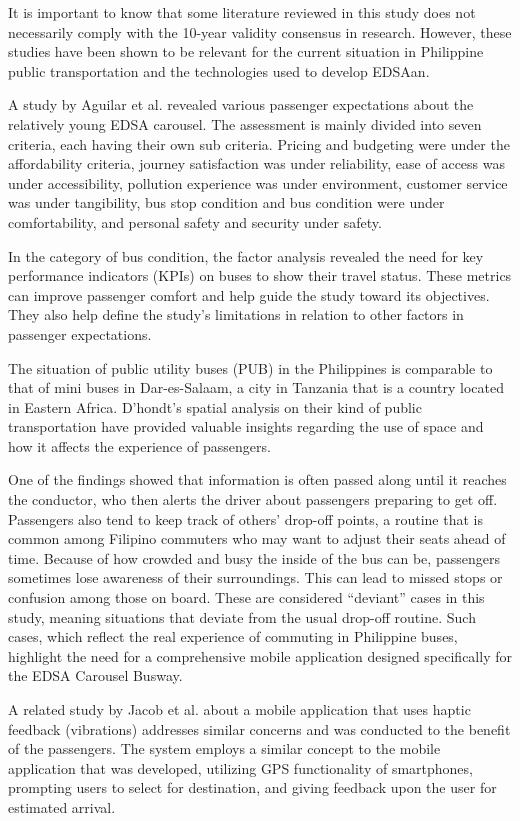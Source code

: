 \documentclass[journal]{./IEEE/IEEEtran}
\begin{document}
It is important to know that some literature reviewed in this study does not necessarily comply with the 10-year validity consensus in research. However, these studies have been shown to be relevant for the current situation in Philippine public transportation and the technologies used to develop EDSAan.

A study by Aguilar et al. \cite{Ref:001} revealed various passenger expectations about the relatively young EDSA carousel. The assessment is mainly divided into seven criteria, each having their own sub criteria. Pricing and budgeting were under the affordability criteria, journey satisfaction was under reliability,  ease of access was under accessibility, pollution experience was under environment, customer service was under tangibility, bus stop condition and bus condition were under comfortability, and personal safety and security under safety.

In the category of bus condition, the factor analysis revealed the need for key performance indicators (KPIs) on buses to show their travel status. These metrics can improve passenger comfort and help guide the study toward its objectives. They also help define the study’s limitations in relation to other factors in passenger expectations.

The situation of public utility buses (PUB) in the Philippines is comparable to that of mini buses in Dar-es-Salaam, a city in Tanzania that is a country located in Eastern Africa. D’hondt’s \cite{Ref:005} spatial analysis on their kind of public transportation have provided valuable insights regarding the use of space and how it affects the experience of passengers.

One of the findings showed that information is often passed along until it reaches the conductor, who then alerts the driver about passengers preparing to get off. Passengers also tend to keep track of others' drop-off points, a routine that is common among Filipino commuters who may want to adjust their seats ahead of time. Because of how crowded and busy the inside of the bus can be, passengers sometimes lose awareness of their surroundings. This can lead to missed stops or confusion among those on board. These are considered “deviant” cases in this study, meaning situations that deviate from the usual drop-off routine. Such cases, which reflect the real experience of commuting in Philippine buses, highlight the need for a comprehensive mobile application designed specifically for the EDSA Carousel Busway.

A related study by Jacob et al. \cite{Ref:009} about a mobile application that uses haptic feedback (vibrations) addresses similar concerns and was conducted to the benefit of the passengers. The system employs a similar concept to the mobile application that was developed, utilizing GPS functionality of smartphones, prompting users to select for destination, and giving feedback upon the user for estimated arrival.
\end{document}
